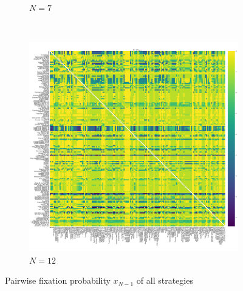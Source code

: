 \documentclass{article}
\begin{document}
\begin{figure}[!hbtp]
\begin{subfigure}[t]{.3\textwidth}
        \caption{\(N=7\)}
    \end{subfigure}%
    ~
    \begin{subfigure}[t]{.3\textwidth}
        \centering
        \includegraphics[width=.8\textwidth]{./img/fixation_heatmap_12_resist.pdf}
        \caption{\(N=12\)}

    \end{subfigure}%

    \caption{Pairwise fixation probability \(x_{N-1}\) of all strategies}
    \label{fig:fixation_heatmap_resist}
\end{figure}
\end{document}
